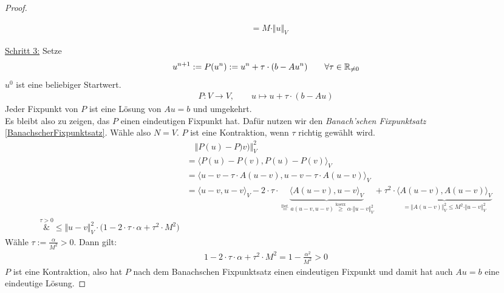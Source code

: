 \begin{proof}
\begin{enumerate}[label=(\alph*)]
\begin{align*}
&=M\cdot\Vert u\Vert_V
\end{align*}
\end{enumerate}
\underline{Schritt 3:} Setze
\begin{align*}
u^{n+1}:=P(u^n):=u^n+\tau\cdot(b-A u^n)\qquad\forall\tau\in\mathbb{R}_{\neq0}
\end{align*}
$u^0$ ist eine beliebiger Startwert.
\begin{align*}
P:V\to V,\qquad u\mapsto u+\tau\cdot(b-Au)
\end{align*}
Jeder Fixpunkt von $P$ ist eine Lösung von $Au=b$ und umgekehrt.\\
Es bleibt also zu zeigen, das $P$ einen eindeutigen Fixpunkt hat. Dafür nutzen wir den \textit{Banach'schen Fixpunktsatz} \ref{BanachscherFixpunktsatz}.\nl
Wähle also $N=V$. $P$ ist eine Kontraktion, wenn $\tau$ richtig gewählt wird.
\begin{align*}
&\quad\Vert P(u)-P)v)\Vert^2_V\\
&=\big\langle P(u)-P(v),P(u)-P(v)\big\rangle_V\\
&=\big\langle u-v-\tau\cdot A(u-v),u-v-\tau\cdot A(u-v)\big\rangle_V\\
&=\langle u-v,u-v\rangle_V-2\cdot\tau\cdot\underbrace{\big\langle A(u-v),u-v\big\rangle_V}_{\stackrel{\text{Def.}}{=}a(u-v,u-v)\stackrel{\text{koerz}}{\geq}\alpha\cdot\Vert u-v\Vert^2_V}+\tau^2\cdot\underbrace{\big\langle A(u-v),A(u-v)\big\rangle_V}_{=\Vert A(u-v)\Vert^2_V\leq M^2\cdot\Vert u-v\Vert^2_V}\\
\overset{\tau>0}&{\leq}
\Vert u-v\Vert^2_V\cdot\big(1-2\cdot\tau\cdot\alpha+\tau^2\cdot M^2\big)
\end{align*}
Wähle $\tau:=\frac{\alpha}{M^2}>0$. Dann gilt:
\begin{align*}
1-2\cdot\tau\cdot\alpha+\tau^2\cdot M^2=1-\frac{\alpha^2}{M^2}>0
\end{align*}
$P$ ist eine Kontraktion, also hat $P$ nach dem Banachschen Fixpunktsatz einen eindeutigen Fixpunkt und damit hat auch $Au=b$ eine eindeutige Lösung.
\end{proof}


